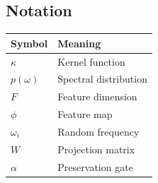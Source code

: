 \subsection{Notation}

\begin{table}[H]
\centering
\small
\begin{tabular}{ll}
\toprule
\textbf{Symbol} & \textbf{Meaning} \\
\midrule
$\kappa$ & Kernel function \\
$p(\omega)$ & Spectral distribution \\
$F$ & Feature dimension \\
$\phi$ & Feature map \\
$\omega_i$ & Random frequency \\
$W$ & Projection matrix \\
$\alpha$ & Preservation gate \\
\bottomrule
\end{tabular}
\end{table}

